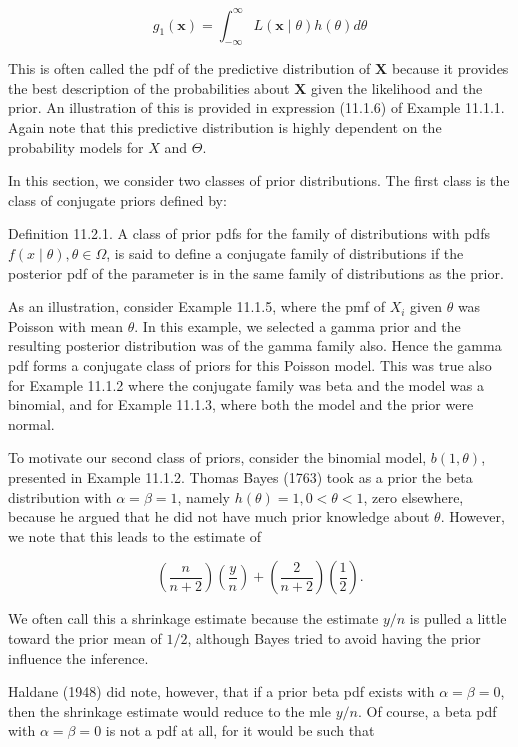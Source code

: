 $$
g_{1}(\mathbf{x})=\int_{-\infty}^{\infty} L(\mathbf{x} \mid \theta) h(\theta) d \theta
$$

This is often called the pdf of the predictive distribution of $\mathbf{X}$ because it provides the best description of the probabilities about $\mathbf{X}$ given the likelihood and the prior. An illustration of this is provided in expression (11.1.6) of Example 11.1.1. Again note that this predictive distribution is highly dependent on the probability models for $X$ and $\Theta$.

In this section, we consider two classes of prior distributions. The first class is the class of conjugate priors defined by:

Definition 11.2.1. A class of prior pdfs for the family of distributions with pdfs $f(x \mid \theta), \theta \in \Omega$, is said to define a conjugate family of distributions if the posterior pdf of the parameter is in the same family of distributions as the prior.

As an illustration, consider Example 11.1.5, where the pmf of $X_{i}$ given $\theta$ was Poisson with mean $\theta$. In this example, we selected a gamma prior and the resulting posterior distribution was of the gamma family also. Hence the gamma pdf forms a conjugate class of priors for this Poisson model. This was true also for Example 11.1.2 where the conjugate family was beta and the model was a binomial, and for Example 11.1.3, where both the model and the prior were normal.

To motivate our second class of priors, consider the binomial model, $b(1, \theta)$, presented in Example 11.1.2. Thomas Bayes (1763) took as a prior the beta distribution with $\alpha=\beta=1$, namely $h(\theta)=1,0<\theta<1$, zero elsewhere, because he argued that he did not have much prior knowledge about $\theta$. However, we note that this leads to the estimate of

$$
\left(\frac{n}{n+2}\right)\left(\frac{y}{n}\right)+\left(\frac{2}{n+2}\right)\left(\frac{1}{2}\right) .
$$

We often call this a shrinkage estimate because the estimate $y / n$ is pulled a little toward the prior mean of $1 / 2$, although Bayes tried to avoid having the prior influence the inference.

Haldane (1948) did note, however, that if a prior beta pdf exists with $\alpha=\beta=0$, then the shrinkage estimate would reduce to the mle $y / n$. Of course, a beta pdf with $\alpha=\beta=0$ is not a pdf at all, for it would be such that

